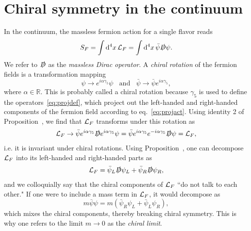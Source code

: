 %
%

\section{Chiral symmetry in the continuum}\label{sec:cscont}

In the continuum, the massless fermion action for a single flavor reads
\begin{equation}
S_F=\int\dd[4]{x}\mathcal{L}_F=\int\dd[4]{x}\bar{\psi}\slashed{D}\psi. 
\end{equation}
We refer to $\slashed{D}$ as the {\it massless Dirac operator}. A 
{\it chiral rotation} of the fermion fields is a transformation
mapping
\begin{equation}
  \psi\to e^{i\alpha\gamma_5}\psi~~~~\text{and}~~~~
  \bar{\psi}\to\bar\psi e^{i\alpha\gamma_5},
\end{equation}
where $\alpha\in\mathbb{R}$. This is probably called a chiral rotation
because $\gamma_5$ is used to define the operators~\eqref{eq:projdef},
which project out the left-handed and right-handed components of the
fermion field according to eq.~\eqref{eq:projact}. Using identity 2 of
Proposition~, we find that $\mathcal{L}_F$ transforms under this
rotation as
\begin{equation}
  \mathcal{L}_F\to\bar{\psi}e^{i\alpha\gamma_5}\slashed{D}e^{i\alpha\gamma_5}\psi
         =\bar{\psi}e^{i\alpha\gamma_5}e^{-i\alpha\gamma_5}\slashed{D}\psi
         =\mathcal{L}_F,
\end{equation}
i.e. it is invariant under chiral rotations. Using
Proposition~, one can decompose $\mathcal{L}_F$ into its
left-handed and right-handed parts as
\begin{equation}
  \mathcal{L}_F=\bar{\psi}_L\slashed{D}\psi_L
         +\bar{\psi}_R\slashed{D}\psi_R,
\end{equation}
and we colloquially say that the chiral components of
$\mathcal{L}_F$ ``do not talk to each other."
If one were to include a mass term in $\mathcal{L}_F$, it would decompose as
\begin{equation}
  m\bar{\psi}\psi=m\left(\bar{\psi}_R\psi_L+\bar{\psi}_L\psi_R\right),
\end{equation}
which mixes the chiral components, thereby breaking chiral symmetry.
This is why one refers to the limit $m\to0$ as the {\it chiral limit}.

